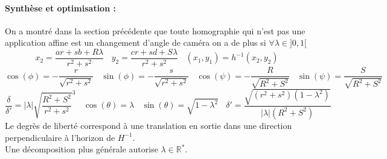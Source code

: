  \paragraph{Synthèse et optimisation :}
 On a montré dans la section précédente que toute homographie qui n'est pas une application affine est un changement d'angle de caméra on a de plus  si $ \forall \lambda \in ]0,1[$ 
 \begin{equation*}
x_2=\frac{ar+sb+R \lambda}{r^2 +s^2}~~~~y_2=\frac{cr+sd+S \lambda}{r^2 +s^2}~~~~(x_1 , y_1) = h^{-1}(x_{2},y_{2})
\end{equation*}
 \begin{equation*}
 \cos( \phi )= - \frac{r}{\sqrt{r^2 + s^2}}~~~~ \sin( \phi )= - \frac{s}{\sqrt{r^2 + s^2}}~~~~\cos( \psi ) =- \frac{R}{\sqrt{R^2 + S^2}}~~~~ \sin( \psi ) = \frac{S}{\sqrt{R^2 + S^2}}
 \end{equation*}
 \begin{equation*}
 \frac{\delta}{\delta'}=|\lambda|\sqrt{\frac{R^2 + S^2}{r^2 + s^2}}^{3}~~~~\cos(\theta)=\lambda~~~~\sin(\theta)=\sqrt{1-\lambda^2}~~~~\delta'=  \frac{\sqrt{(r^2 + s^2)(1-\lambda^2)}}{|\lambda| (R^2+S^2)}
 \end{equation*}
 Le degrès de liberté correspond à une translation en sortie dans une direction perpendiculaire à l'horizon de $H^{-1}$.\\
 Une décomposition plus générale autorise $\lambda \in \mathbb{R}^{*}$.
